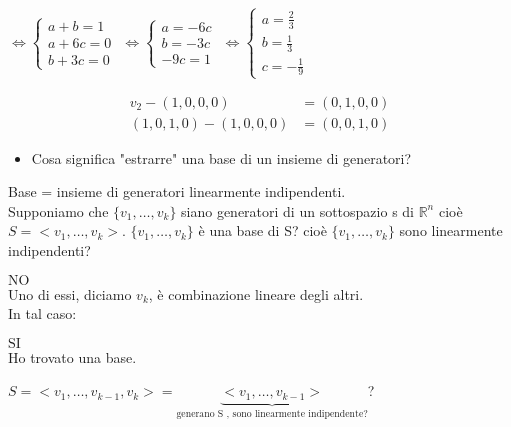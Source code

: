 \(
\Leftrightarrow
\begin{cases*}
	a + b = 1 \\
	a + 6c = 0\\
	b + 3c = 0
\end{cases*}
\)
\(
\Leftrightarrow
\begin{cases*}
	a = -6c\\
	b = -3c\\
	-9c = 1
\end{cases*}
\)
\(
\Leftrightarrow
\begin{cases*}
	a = \frac{2}{3}\\
	b = \frac{1}{3}\\
	c = -\frac{1}{9}
\end{cases*}
\)

\begin{align*}
	v_2 - (1,0,0,0) &= (0,1,0,0)\\
	(1,0,1,0) - (1,0,0,0) &= (0,0,1,0)
\end{align*}

\begin{itemize}
	\item \textsf{\small Cosa significa "estrarre" una base di un insieme di generatori?}
\end{itemize}\vskip-1mm
\textsf{\small Base = insieme di generatori linearmente indipendenti.}\\
\textsf{\small Supponiamo che $\{ v_1, \dots, v_k\}$ siano generatori di un sottospazio s di $\mathbb{R}^n$ cioè $S = <v_1, \dots, v_k>$. $\{ v_1, \dots, v_k\}$ è una base di S? cioè $\{ v_1, \dots, v_k\}$ sono linearmente indipendenti?}\\

\noindent\begin{minipage}{.5\linewidth}
	$\boxed{\text{NO}}$\\
	\textsf{\small Uno di essi, diciamo $v_k$, è combinazione lineare degli altri.}\\
	\textsf{\small In tal caso:}
\end{minipage}
\begin{minipage}{.45\linewidth}
	$\boxed{\text{SI}}$\\
	\textsf{\small Ho trovato una base.}\\
\end{minipage}
\centering $S = <v_1, \dots, v_{k-1}, v_k> = \underbrace{<v_1, \dots, v_{k-1}>} _{\text{generano S , sono linearmente indipendente?}}$?


